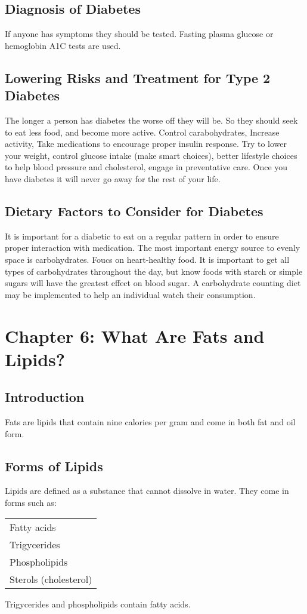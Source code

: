 \documentclass[letterpaper, 11pt]{article}
\begin{document}
\subsection{Diagnosis of Diabetes}
\label{sec:orgb1d90f2}
If anyone has symptoms they should be tested. Fasting plasma glucose or hemoglobin A1C tests are used.\\
\subsection{Lowering Risks and Treatment for Type 2 Diabetes}
\label{sec:org9b04d5f}
The longer a person has diabetes the worse off they will be. So they should seek to eat less food, and become more active. Control carabohydrates, Increase activity, Take medications to encourage proper insulin response. Try to lower your weight, control glucose intake (make smart choices), better lifestyle choices to help blood pressure and cholesterol, engage in preventative care. Once you have diabetes it will never go away for the rest of your life.\\
\subsection{Dietary Factors to Consider for Diabetes}
\label{sec:org300a3f4}
It is important for a diabetic to eat on a regular pattern in order to ensure proper interaction with medication. The most important energy source to evenly space is carbohydrates. Foucs on heart-healthy food. It is important to get all types of carbohydrates throughout the day, but know foods with starch or simple sugars will have the greatest effect on blood sugar. A carbohydrate counting diet may be implemented to help an individual watch their consumption.\\
\section{Chapter 6: What Are Fats and Lipids?}
\label{sec:org6637ce1}
\subsection{Introduction}
\label{sec:org50bbace}
Fats are lipids that contain nine calories per gram and come in both fat and oil form.\\
\subsection{Forms of Lipids}
\label{sec:org93e6b6e}
Lipids are defined as a substance that cannot dissolve in water. They come in forms such as:\\
\begin{center}
\begin{tabular}{l}
Fatty acids\\
Trigycerides\\
Phospholipids\\
Sterols (cholesterol)\\
\end{tabular}
\end{center}
Trigycerides and phospholipids contain fatty acids.\\
\end{document}
